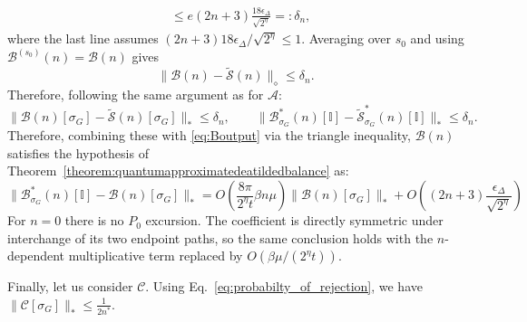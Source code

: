 \documentclass[aps,floatfix,10pt,amssymb,amsfont,amsmath,superscriptaddress,float,nofootinbib,longbibliography,nobalancelastpage,twocolumn]{revtex4-2}
\begin{document}
\begin{widetext}
\begin{align}
     &\leq e(2n+3)\frac{18\epsilon_{\Delta}}{\sqrt{2^{\eta}}}=: \delta_n,
\end{align}
where the last line assumes
$(2n+3)18\epsilon_\Delta/\sqrt{2^\eta}\leq1$.  Averaging over $s_0$ and
using $\mathcal B^{(s_0)}(n)=\mathcal B(n)$ gives
\begin{equation}
    \|\mathcal B(n)-\tilde{\mathcal S}(n)\|_\diamond\leq\delta_n.
\end{equation}
Therefore, following the same argument as for $\mathcal{A}$:
\begin{equation}
    \|\mathcal{B}(n)[\sigma_G] - \tilde{\mathcal{S}}(n)[\sigma_G]\|_* \leq \delta_n,
    \qquad \|\mathcal{B}^*_{\sigma_G}(n)[\mathbb{I}] - \tilde{\mathcal{S}}^*_{\sigma_G}(n)[\mathbb{I}]\|_* \leq \delta_n.
\end{equation}
Therefore, combining these with \eqref{eq:Boutput} via the triangle inequality, $\mathcal{B}(n)$ satisfies the hypothesis of Theorem~\ref{theorem:quantumapproximatedeatildedbalance} as:
\begin{equation}
    \|\mathcal{B}^*_{\sigma_G}(n)[\mathbb{I}] - \mathcal{B}(n)[\sigma_G]\|_* = O\left(\frac{8\pi}{2^{\eta}t}\beta n\mu\right)\|\mathcal{B}(n)[\sigma_G]\|_* +O\left((2n+3)\frac{\epsilon_{\Delta}}{\sqrt{2^{\eta}}}\right) 
\end{equation}
For $n=0$ there is no $P_0$ excursion.  The coefficient is directly
symmetric under interchange of its two endpoint paths, so the same conclusion
holds with the $n$-dependent multiplicative term replaced by $O(\beta\mu/(2^{\eta}t))$.

Finally, let us consider $\mathcal{C}$. Using Eq.~\eqref{eq:probabilty_of_rejection}, we have $\|\mathcal{C}[\sigma_G]\|_{*}\leq\frac{1}{2n^*}$.



\end{widetext}
\end{document}
